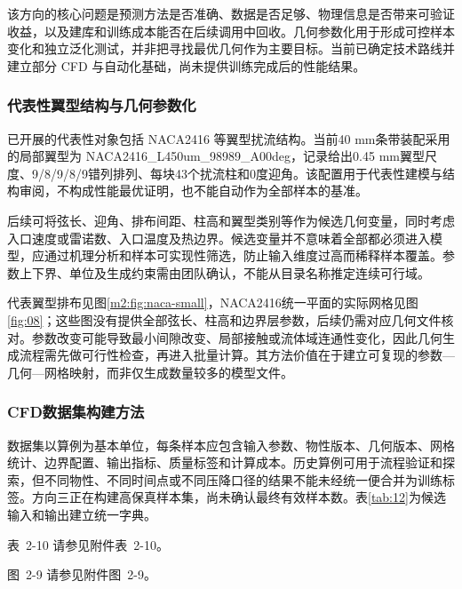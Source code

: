 \documentclass[UTF8]{midterm}
\makeatletter
\newcommand{\submissionnumber}[1]{\def\@currentlabel{#1}}
\makeatother
\begin{document}
该方向的核心问题是预测方法是否准确、数据是否足够、物理信息是否带来可验证收益，以及建库和训练成本能否在后续调用中回收。几何参数化用于形成可控样本变化和独立泛化测试，并非把寻找最优几何作为主要目标。当前已确定技术路线并建立部分 CFD 与自动化基础，尚未提供训练完成后的性能结果。

\subsubsection{代表性翼型结构与几何参数化}
已开展的代表性对象包括 NACA2416 等翼型扰流结构。当前40 mm条带装配采用的局部翼型为 NACA2416\_L450um\_98989\_A00deg，记录给出0.45 mm翼型尺度、9/8/9/8/9错列排列、每块43个扰流柱和0度迎角。该配置用于代表性建模与结构审阅，不构成性能最优证明，也不能自动作为全部样本的基准。

后续可将弦长、迎角、排布间距、柱高和翼型类别等作为候选几何变量，同时考虑入口速度或雷诺数、入口温度及热边界。候选变量并不意味着全部都必须进入模型，应通过机理分析和样本可实现性筛选，防止输入维度过高而稀释样本覆盖。参数上下界、单位及生成约束需由团队确认，不能从目录名称推定连续可行域。


代表翼型排布见图\ref{m2:fig:naca-small}，NACA2416统一平面的实际网格见图\ref{fig:08}；这些图没有提供全部弦长、柱高和边界层参数，后续仍需对应几何文件核对。参数改变可能导致最小间隙改变、局部接触或流体域连通性变化，因此几何生成流程需先做可行性检查，再进入批量计算。其方法价值在于建立可复现的参数—几何—网格映射，而非仅生成数量较多的模型文件。

\subsubsection{CFD数据集构建方法}
数据集以算例为基本单位，每条样本应包含输入参数、物性版本、几何版本、网格统计、边界配置、输出指标、质量标签和计算成本。历史算例可用于流程验证和探索，但不同物性、不同时间点或不同压降口径的结果不能未经统一便合并为训练标签。方向三正在构建高保真样本集，尚未确认最终有效样本数。表\ref{tab:12}为候选输入和输出建立统一字典。

\par\noindent \begingroup\submissionnumber{2-10}\label{tab:12}\endgroup 表~2-10 请参见附件表~2-10。\par



\par\noindent \begingroup\submissionnumber{2-9}\label{fig:24}\endgroup 图~2-9 请参见附件图~2-9。\par
\end{document}

